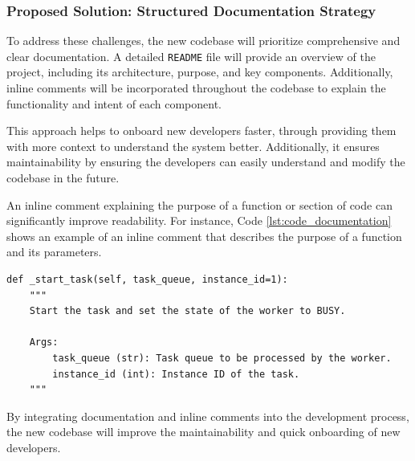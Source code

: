 \subsubsection{Proposed Solution: Structured Documentation Strategy}
To address these challenges, the new codebase will prioritize comprehensive and clear documentation. A detailed \texttt{README} file will provide an overview of the project, including its architecture, purpose, and key components. Additionally, inline comments will be incorporated throughout the codebase to explain the functionality and intent of each component.

This approach helps to onboard new developers faster, through providing them with more context to understand the system better. Additionally, it ensures maintainability by ensuring the developers can easily understand and modify the codebase in the future.

An inline comment explaining the purpose of a function or section of code can significantly improve readability. For instance, Code \ref{lst:code_documentation} shows an example of an inline comment that describes the purpose of a function and its parameters.

\begin{lstlisting}[caption={Example Code Documentation}, label={lst:code_documentation}]
def _start_task(self, task_queue, instance_id=1):
    """
    Start the task and set the state of the worker to BUSY.

    Args:
        task_queue (str): Task queue to be processed by the worker.
        instance_id (int): Instance ID of the task.
    """
\end{lstlisting}

By integrating documentation and inline comments into the development process, the new codebase will improve the maintainability and quick onboarding of new developers.
